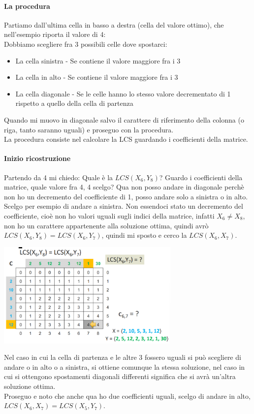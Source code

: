 \paragraph*{La procedura} Partiamo dall'ultima cella in basso a destra (cella del valore ottimo),
che nell'esempio riporta il valore di 4:\\
Dobbiamo scegliere fra 3 possibili celle dove spostarci:
\begin{itemize}
    \item La cella sinistra - Se contiene il valore maggiore fra i 3
    \item La cella in alto - Se contiene il valore maggiore fra i 3
    \item La cella diagonale - Se le celle hanno lo stesso valore decrementato di 1 rispetto a
    quello della cella di partenza
\end{itemize}
Quando mi muovo in diagonale salvo il carattere di riferimento della colonna (o riga, tanto saranno uguali) e proseguo
con la procedura.\\
La procedura consiste nel calcolare la LCS guardando i coefficienti della matrice.\\
\paragraph*{Inizio ricostruzione} Partendo da 4 mi chiedo: Quale è la $LCS(X_6, Y_8)$? Guardo i coefficienti della matrice, quale valore fra 4, 4 scelgo? Qua non posso andare in diagonale perchè 
non ho un decremento del coefficiente di 1, posso andare solo a sinistra o in alto. Scelgo per esempio
di andare a sinistra. Non essendoci stato un decremento del coefficiente, cioè non ho valori uguali sugli indici della
matrice, infatti $X_6 \neq X_8$, non ho un carattere appartenente alla soluzione ottima, quindi avrò $LCS(X_6, Y_8) = LCS(X_6, Y_7)$,
quindi mi sposto e cerco la $LCS(X_6, X_7)$.
\begin{center}
    \includegraphics[width=90mm,scale=0.5]{chapters_ulerich/img/LCS_matrix_ricostruzione_sol_ottima.png}
\end{center}
Nel caso in cui la cella di partenza e le altre 3 fossero uguali si può scegliere di andare
o in alto o a sinistra, si ottiene comunque la stessa soluzione, nel caso in cui si ottengono spostamenti
diagonali differenti significa che si avrà un'altra soluzione ottima.\\
Proseguo e noto che anche qua ho due coefficienti uguali, scelgo di andare in alto, 
$LCS(X_6, X_7) = LCS(X_5, Y_7)$.
